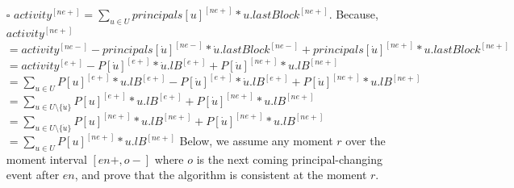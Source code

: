 \documentclass{article}
\begin{document}
\begin{itemize}
\begin{itemize}
    \item[$\square$] $ activity^{[ne+]} = \sum_{u \in U} principals[u]^{[ne+]} * u.lastBlock^{[ne+]}$.
    \newline \newline
    Because, $ activity^{[ne+]}$
    \newline \newline
    $ = activity^{[ne-]} - principals[\dot u]^{[ne-]} * \dot{u}.lastBlock^{[ne-]} + principals[\dot u]^{[ne+]} * u.lastBlock^{[ne+]} $
    \newline \newline
    $ = activity^{[e+]} - P[\dot u]^{[e+]} * \dot{u}.lB^{[e+]} + P[\dot u]^{[ne+]} * u.lB^{[ne+]} $
    \newline \newline
    $ = \sum_{u \in U} P[u]^{[e+]} * u.lB^{[e+]} - P[\dot u]^{[e+]} * \dot{u}.lB^{[e+]}
    + P[\dot u]^{[ne+]} * u.lB^{[ne+]} $ 
    \newline \newline
    $ = \sum_{u \in U \setminus \{\dot u\}} P[u]^{[e+]} * u.lB^{[e+]} + P[\dot u]^{[ne+]} * u.lB^{[ne+]} $
    \newline \newline
    $ = \sum_{u \in U \setminus \{\dot u\}} P[u]^{[ne+]} * u.lB^{[ne+]} + P[\dot u]^{[ne+]} * u.lB^{[ne+]} $
    \newline \newline
    $ = \sum_{u \in U} P[u]^{[ne+]} * u.lB^{[ne+]}  $
    \newline \newline
    Below, we assume any moment $r$ over the moment interval $[en+, o-]$ where $o$ is the next 
    coming principal-changing event after $en$, and prove that the algorithm is 
    consistent at the moment $r$.


\end{itemize}
\end{itemize}
\end{document}
